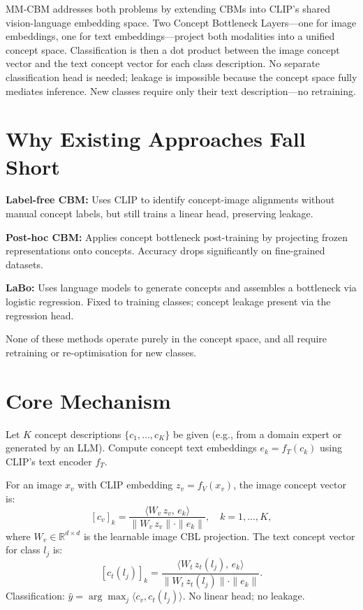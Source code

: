 \documentclass[10pt,twocolumn]{article}
\begin{document}
MM-CBM addresses both problems by extending CBMs into CLIP's shared
vision-language embedding space. Two Concept Bottleneck Layers---one for
image embeddings, one for text embeddings---project both modalities into
a unified concept space. Classification is then a dot product between the
image concept vector and the text concept vector for each class description.
No separate classification head is needed; leakage is impossible because
the concept space fully mediates inference. New classes require only their
text description---no retraining.

\section{Why Existing Approaches Fall Short}

\textbf{Label-free CBM:} Uses CLIP to identify concept-image alignments
without manual concept labels, but still trains a linear head, preserving
leakage.

\textbf{Post-hoc CBM:} Applies concept bottleneck post-training by
projecting frozen representations onto concepts. Accuracy drops significantly
on fine-grained datasets.

\textbf{LaBo:} Uses language models to generate concepts and assembles
a bottleneck via logistic regression. Fixed to training classes; concept
leakage present via the regression head.

None of these methods operate purely in the concept space, and all
require retraining or re-optimisation for new classes.

\section{Core Mechanism}

Let $K$ concept descriptions $\{c_1,\ldots,c_K\}$ be given (e.g., from
a domain expert or generated by an LLM). Compute concept text embeddings
$e_k = f_T(c_k)$ using CLIP's text encoder $f_T$.

For an image $x_v$ with CLIP embedding $z_v = f_V(x_v)$, the image
concept vector is:
\[
[c_v]_k = \frac{\langle W_v\,z_v,\,e_k\rangle}
               {\|W_v\,z_v\|\cdot\|e_k\|},
\quad k=1,\ldots,K,
\]
where $W_v\in\mathbb{R}^{d\times d}$ is the learnable image CBL projection.
The text concept vector for class $l_j$ is:
\[
[c_t(l_j)]_k = \frac{\langle W_t\,z_t(l_j),\,e_k\rangle}
                    {\|W_t\,z_t(l_j)\|\cdot\|e_k\|}.
\]
Classification: $\hat y = \arg\max_j \langle c_v, c_t(l_j)\rangle$.
No linear head; no leakage.
\end{document}
